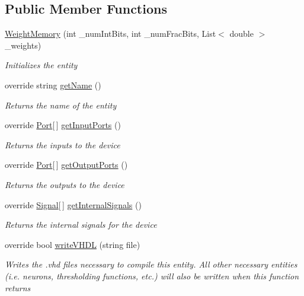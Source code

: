 \subsection*{Public Member Functions}
\begin{DoxyCompactItemize}
\item 
\hyperlink{class_n_n_gen_1_1_weight_memory_a5be8cc5e6e42aedf41967c299efd75cf}{Weight\+Memory} (int \+\_\+num\+Int\+Bits, int \+\_\+num\+Frac\+Bits, List$<$ double $>$ \+\_\+weights)
\begin{DoxyCompactList}\small\item\em Initializes the entity \end{DoxyCompactList}\item 
override string \hyperlink{class_n_n_gen_1_1_weight_memory_a000cfa9b5dd1d41042ed77dbad178aeb}{get\+Name} ()
\begin{DoxyCompactList}\small\item\em Returns the name of the entity \end{DoxyCompactList}\item 
override \hyperlink{class_n_n_gen_1_1_port}{Port}\mbox{[}$\,$\mbox{]} \hyperlink{class_n_n_gen_1_1_weight_memory_a0f80fe3a06082c2e238f1c7b552c723d}{get\+Input\+Ports} ()
\begin{DoxyCompactList}\small\item\em Returns the inputs to the device \end{DoxyCompactList}\item 
override \hyperlink{class_n_n_gen_1_1_port}{Port}\mbox{[}$\,$\mbox{]} \hyperlink{class_n_n_gen_1_1_weight_memory_a96cae98991fe72526efcc94aa27c3294}{get\+Output\+Ports} ()
\begin{DoxyCompactList}\small\item\em Returns the outputs to the device \end{DoxyCompactList}\item 
override \hyperlink{class_n_n_gen_1_1_signal}{Signal}\mbox{[}$\,$\mbox{]} \hyperlink{class_n_n_gen_1_1_weight_memory_a7166780b7824c585e92da81172aaba22}{get\+Internal\+Signals} ()
\begin{DoxyCompactList}\small\item\em Returns the internal signals for the device \end{DoxyCompactList}\item 
override bool \hyperlink{class_n_n_gen_1_1_weight_memory_a638a0f1ce7d8f3983ef0a0beb59e887d}{write\+V\+H\+D\+L} (string file)
\begin{DoxyCompactList}\small\item\em Writes the .vhd files necessary to compile this entity. All other necessary entities (i.\+e. neurons, thresholding functions, etc.) will also be written when this function returns \end{DoxyCompactList}\end{DoxyCompactItemize}
